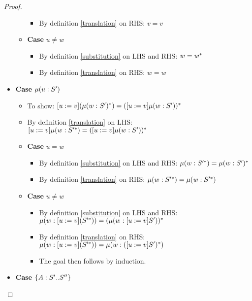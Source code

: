 \begin{proof}
\begin{itemize}
\begin{itemize}
\begin{itemize}
                \item By definition \ref{translation} on RHS: $v = v$
            \end{itemize}
            \item \textbf{Case} $u \neq w$
            \begin{itemize}
                \item By definition \ref{substitution} on LHS and RHS:
                    $w = w^{*}$
                \item By definition \ref{translation} on RHS: $w = w$
            \end{itemize}
        \end{itemize}
        \item \textbf{Case} $\mu(u : S')$
        \begin{itemize}
            \item To show: $[u := v](\mu(w : S')^{*}) =
                ([u := v]\mu(w : S'))^{*}$
            \item By definition \ref{translation} on LHS:
                $[u := v]\mu(w : S'^{*}) = ([u := v]\mu(w : S'))^{*}$
            \item \textbf{Case} $u = w$
            \begin{itemize}
                \item By definition \ref{substitution} on LHS and RHS:
                    $\mu(w : S'^{*}) = \mu(w : S')^{*}$
                \item By definition \ref{translation} on RHS:
                    $\mu(w : S'^{*}) = \mu(w : S'^{*})$
            \end{itemize}
            \item \textbf{Case} $u \neq w$
            \begin{itemize}
                \item By definition \ref{substitution} on LHS and RHS:
                    $\mu(w : [u := v](S'^{*})) =
                    (\mu(w : [u := v]S'))^{*}$
                \item By definition \ref{translation} on RHS:
                    $\mu(w : [u := v](S'^{*})) =
                    \mu(w : ([u := v]S')^{*})$
                \item The goal then follows by induction.
            \end{itemize}
        \end{itemize}
        \item \textbf{Case} $\{A : S' .. S''\}$

\end{itemize}
\end{proof}
